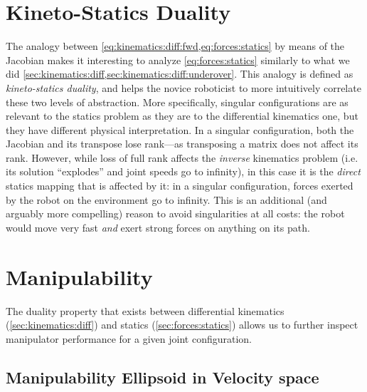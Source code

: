 


\section{Kineto-Statics Duality}\label{sec:forces:kinetostatics}

The analogy between \cref{eq:kinematics:diff:fwd,eq:forces:statics} by means of the Jacobian makes it interesting to analyze \cref{eq:forces:statics} similarly to what we did \cref{sec:kinematics:diff,sec:kinematics:diff:underover}.
This analogy is defined as \textsl{kineto-statics duality}, and helps the novice roboticist to more intuitively correlate these two levels of abstraction.
More specifically, singular configurations are as relevant to the statics problem as they are to the differential kinematics one, but they have different physical interpretation.
In a singular configuration, both the Jacobian and its transpose lose rank---as transposing a matrix does not affect its rank. However, while loss of full rank affects the \textsl{inverse} kinematics problem (i.e. its solution ``explodes'' and joint speeds go to infinity), in this case it is the \textsl{direct} statics mapping that is affected by it: in a singular configuration, forces exerted by the robot on the environment go to infinity.
This is an additional (and arguably more compelling) reason to avoid singularities at all costs: the robot would move very fast \textsl{and} exert strong forces on anything on its path.

\section{Manipulability}\label{sec:forces:manipulability}

The duality property that exists between differential kinematics (\cref{sec:kinematics:diff}) and statics (\cref{sec:forces:statics}) allows us to further inspect manipulator performance for a given joint configuration.

\subsection{Manipulability Ellipsoid in Velocity space}

